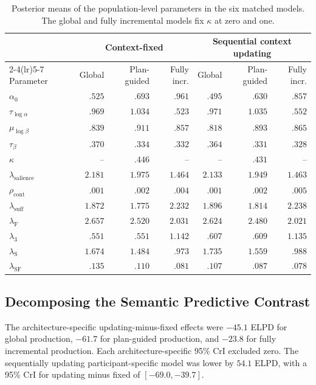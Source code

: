 \documentclass[10pt,a4paper,fleqn]{article}
\begin{document}
\begin{table}[H]
\centering
\caption{Posterior means of the population-level parameters in the six matched models. The global and fully incremental models fix $\kappa$ at zero and one.}
\label{tab:posterior-matched}
\footnotesize
\begin{tabularx}{\textwidth}{X rrr rrr}
\toprule
 & \multicolumn{3}{c}{Context-fixed} & \multicolumn{3}{c}{Sequential context updating} \\
\cmidrule(lr){2-4}\cmidrule(lr){5-7}
Parameter & Global & Plan-guided & Fully incr. & Global & Plan-guided & Fully incr. \\
\midrule
$\alpha_0$ & $.525$ & $.693$ & $.961$ & $.495$ & $.630$ & $.857$ \\
$\tau_{\log\alpha}$ & $.969$ & $1.034$ & $.523$ & $.971$ & $1.035$ & $.552$ \\
$\mu_{\log\beta}$ & $.839$ & $.911$ & $.857$ & $.818$ & $.893$ & $.865$ \\
$\tau_\beta$ & $.370$ & $.334$ & $.332$ & $.364$ & $.331$ & $.328$ \\
$\kappa$ & -- & $.446$ & -- & -- & $.431$ & -- \\
$\lambda_{\mathrm{salience}}$ & $2.181$ & $1.975$ & $1.464$ & $2.133$ & $1.949$ & $1.463$ \\
$\rho_{\mathrm{cont}}$ & $.001$ & $.002$ & $.004$ & $.001$ & $.002$ & $.005$ \\
$\lambda_{\mathrm{suff}}$ & $1.872$ & $1.775$ & $2.232$ & $1.896$ & $1.814$ & $2.238$ \\
$\lambda_{\mathrm{F}}$ & $2.657$ & $2.520$ & $2.031$ & $2.624$ & $2.480$ & $2.021$ \\
$\lambda_{3}$ & $.551$ & $.551$ & $1.142$ & $.607$ & $.609$ & $1.135$ \\
$\lambda_{\mathrm{S}}$ & $1.674$ & $1.484$ & $.973$ & $1.735$ & $1.559$ & $.988$ \\
$\lambda_{\mathrm{SF}}$ & $.135$ & $.110$ & $.081$ & $.107$ & $.087$ & $.078$ \\
\bottomrule
\end{tabularx}
\end{table}

\subsection{Decomposing the Semantic Predictive Contrast}
\label{sec:semantic-score-decomposition}

The architecture-specific updating-minus-fixed effects were $-45.1$ ELPD for global production, $-61.7$ for plan-guided production, and $-23.8$ for fully incremental production.
Each architecture-specific 95\% CrI excluded zero.
The sequentially updating participant-specific model was lower by $54.1$ ELPD, with a 95\% CrI for updating minus fixed of $[-69.0,-39.7]$.
\end{document}
